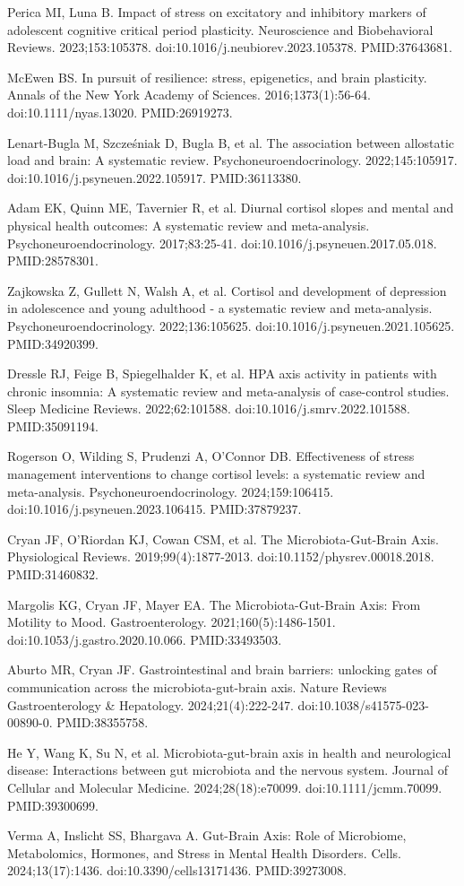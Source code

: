 \documentclass[11pt,oneside]{book}
\newcommand{\reff}[2]{\par\hangindent=7mm\hangafter=1\noindent[#1]\hspace{2mm}#2\par}
\begin{document}
\reff{11}{Perica MI, Luna B. Impact of stress on excitatory and inhibitory markers of adolescent cognitive critical period plasticity. Neuroscience and Biobehavioral Reviews. 2023;153:105378. doi:10.1016/j.neubiorev.2023.105378. PMID:37643681.}
\reff{12}{McEwen BS. In pursuit of resilience: stress, epigenetics, and brain plasticity. Annals of the New York Academy of Sciences. 2016;1373(1):56-64. doi:10.1111/nyas.13020. PMID:26919273.}
\reff{13}{Lenart-Bugla M, Szcześniak D, Bugla B, et al. The association between allostatic load and brain: A systematic review. Psychoneuroendocrinology. 2022;145:105917. doi:10.1016/j.psyneuen.2022.105917. PMID:36113380.}
\reff{14}{Adam EK, Quinn ME, Tavernier R, et al. Diurnal cortisol slopes and mental and physical health outcomes: A systematic review and meta-analysis. Psychoneuroendocrinology. 2017;83:25-41. doi:10.1016/j.psyneuen.2017.05.018. PMID:28578301.}
\reff{15}{Zajkowska Z, Gullett N, Walsh A, et al. Cortisol and development of depression in adolescence and young adulthood - a systematic review and meta-analysis. Psychoneuroendocrinology. 2022;136:105625. doi:10.1016/j.psyneuen.2021.105625. PMID:34920399.}
\reff{16}{Dressle RJ, Feige B, Spiegelhalder K, et al. HPA axis activity in patients with chronic insomnia: A systematic review and meta-analysis of case-control studies. Sleep Medicine Reviews. 2022;62:101588. doi:10.1016/j.smrv.2022.101588. PMID:35091194.}
\reff{17}{Rogerson O, Wilding S, Prudenzi A, O'Connor DB. Effectiveness of stress management interventions to change cortisol levels: a systematic review and meta-analysis. Psychoneuroendocrinology. 2024;159:106415. doi:10.1016/j.psyneuen.2023.106415. PMID:37879237.}
\reff{18}{Cryan JF, O'Riordan KJ, Cowan CSM, et al. The Microbiota-Gut-Brain Axis. Physiological Reviews. 2019;99(4):1877-2013. doi:10.1152/physrev.00018.2018. PMID:31460832.}
\reff{19}{Margolis KG, Cryan JF, Mayer EA. The Microbiota-Gut-Brain Axis: From Motility to Mood. Gastroenterology. 2021;160(5):1486-1501. doi:10.1053/j.gastro.2020.10.066. PMID:33493503.}
\reff{20}{Aburto MR, Cryan JF. Gastrointestinal and brain barriers: unlocking gates of communication across the microbiota-gut-brain axis. Nature Reviews Gastroenterology \& Hepatology. 2024;21(4):222-247. doi:10.1038/s41575-023-00890-0. PMID:38355758.}
\reff{21}{He Y, Wang K, Su N, et al. Microbiota-gut-brain axis in health and neurological disease: Interactions between gut microbiota and the nervous system. Journal of Cellular and Molecular Medicine. 2024;28(18):e70099. doi:10.1111/jcmm.70099. PMID:39300699.}
\reff{22}{Verma A, Inslicht SS, Bhargava A. Gut-Brain Axis: Role of Microbiome, Metabolomics, Hormones, and Stress in Mental Health Disorders. Cells. 2024;13(17):1436. doi:10.3390/cells13171436. PMID:39273008.}
\end{document}
